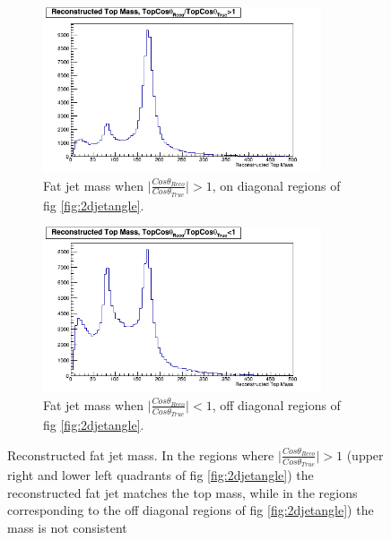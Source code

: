 \begin{figure}
  \centering
  \begin{subfigure}{.5\textwidth}
    \centering
    \includegraphics[width=0.9\textwidth]{figures/TopMassDiagonal.png}
    \caption[$\mid\frac{Cos\theta_{Reco}}{Cos\theta_{True}}\mid >1$]{Fat jet mass when $\mid\frac{Cos\theta_{Reco}}{Cos\theta_{True}}\mid >1$, on diagonal regions of fig \ref{fig:2djetangle}.}
  \end{subfigure}%
  \begin{subfigure}{.5\textwidth}
    \centering
    \includegraphics[width=0.9\textwidth]{figures/TopMassOffDiagonal.png}
    \caption[$\mid\frac{Cos\theta_{Reco}}{Cos\theta_{True}}\mid >1$]{Fat jet mass when $\mid\frac{Cos\theta_{Reco}}{Cos\theta_{True}}\mid <1$, off diagonal regions of fig \ref{fig:2djetangle}.}
  \end{subfigure}
  \caption[Reconstructed fat jet mass]{Reconstructed fat jet mass. In the regions where $\mid\frac{Cos\theta_{Reco}}{Cos\theta_{True}}\mid >1$ (upper right and lower left quadrants of fig \ref{fig:2djetangle}) the reconstructed fat jet matches the top mass, while in the regions corresponding to the off diagonal regions of fig \ref{fig:2djetangle}) the mass is not consistent}
  \label{fig:diagonalTopMass}
\end{figure}


